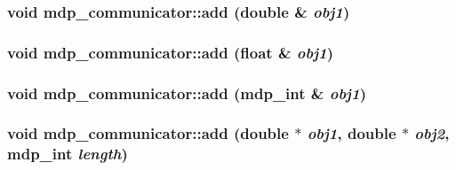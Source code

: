 \label{classmdp__communicator_aedb0bdc142ac49ff99bfa185d8f8da09}
\hypertarget{classmdp__communicator_a9eb1537c0b4252cd9e553bd888630faf}{
\subsubsection[{add}]{\setlength{\rightskip}{0pt plus 5cm}void mdp\_\-communicator::add (double \& {\em obj1})}}
\label{classmdp__communicator_a9eb1537c0b4252cd9e553bd888630faf}
\hypertarget{classmdp__communicator_a0cc36aa2f7f3cdcdfbf179af0a8e355d}{
\subsubsection[{add}]{\setlength{\rightskip}{0pt plus 5cm}void mdp\_\-communicator::add (float \& {\em obj1})}}
\label{classmdp__communicator_a0cc36aa2f7f3cdcdfbf179af0a8e355d}
\hypertarget{classmdp__communicator_a3d61eabaa51bd8492555478025fda1c6}{
\subsubsection[{add}]{\setlength{\rightskip}{0pt plus 5cm}void mdp\_\-communicator::add ({\bf mdp\_\-int} \& {\em obj1})}}
\label{classmdp__communicator_a3d61eabaa51bd8492555478025fda1c6}
\hypertarget{classmdp__communicator_a03f093e5354811e65cd862b6400b51de}{
\subsubsection[{add}]{\setlength{\rightskip}{0pt plus 5cm}void mdp\_\-communicator::add (double $\ast$ {\em obj1}, \/  double $\ast$ {\em obj2}, \/  {\bf mdp\_\-int} {\em length})}}
\label{classmdp__communicator_a03f093e5354811e65cd862b6400b51de}
